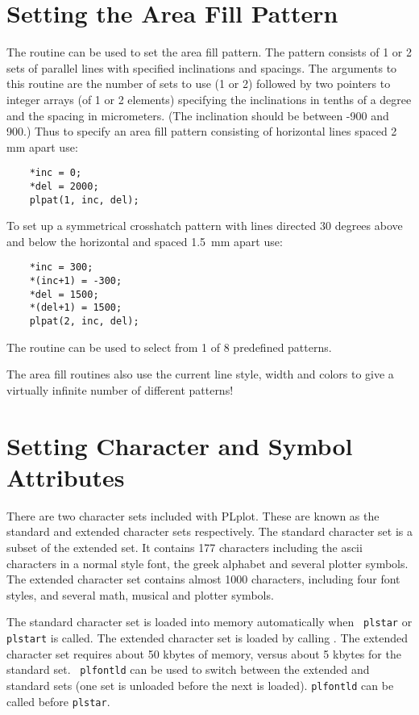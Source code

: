 
\section {Setting the Area Fill Pattern}

The routine  can be used to set the area fill pattern. The
pattern consists of 1 or 2 sets of parallel lines with specified
inclinations and spacings. The arguments to this routine are the
number of sets to use (1 or 2) followed by two pointers to integer
arrays (of 1 or 2 elements) specifying the inclinations in tenths
of a degree and the spacing in micrometers. (The inclination should
be between -900 and 900.) Thus to specify an area fill pattern consisting
of horizontal lines spaced 2\, mm apart use:
\begin{verbatim}
    *inc = 0;
    *del = 2000;
    plpat(1, inc, del);
\end{verbatim}
To set up a symmetrical crosshatch pattern with lines directed 30 degrees
above and below the horizontal and spaced 1.5\, mm apart use:
\begin{verbatim}
    *inc = 300;
    *(inc+1) = -300;
    *del = 1500;
    *(del+1) = 1500;
    plpat(2, inc, del);
\end{verbatim}

The routine  can be used to select from 1 of 8 predefined
patterns.

The area fill routines also use the current line style, width and
colors to give a virtually infinite number of different patterns!


\section {Setting Character and Symbol Attributes}

There are two character sets included with PLplot. These are known as
the standard and extended character sets respectively. The standard
character set is a subset of the extended set. It contains 177
characters including the ascii characters in a normal style font, 
the greek alphabet and several plotter symbols. The extended character
set contains almost 1000 characters, including four font styles, 
and several math, musical and plotter symbols.

The standard character set is loaded into memory automatically when {\tt
plstar} or {\tt plstart} is called. The extended character set is loaded by
calling .  The extended character set requires about 50
kbytes of memory, versus about 5 kbytes for the standard set. {\tt
plfontld} can be used to switch between the extended and standard sets
(one set is unloaded before the next is loaded).  {\tt plfontld} can be
called before {\tt plstar}.

